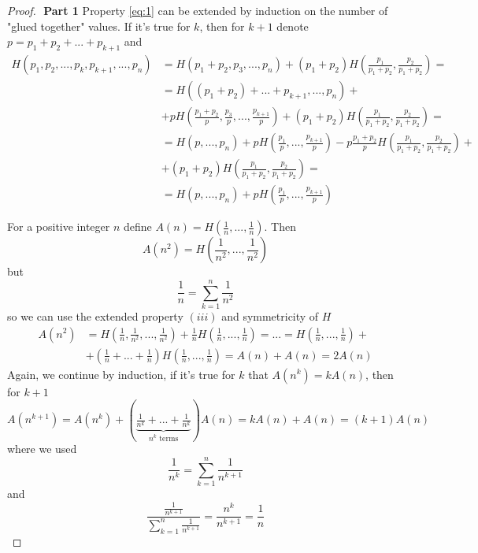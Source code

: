 \documentclass[12pt]{article}
\begin{document}
\begin{proof}
    $ $ 
    \noindent \textbf{Part 1} Property \eqref{eq:1} can be extended by induction on the number of "glued together" values. If it's true for $k$, then for $k+1$ denote $p = p_1 + p_2 + ... + p_{k+1}$ and
    \begin{align*}
        H(p_1, p_2, ..., p_k, p_{k+1}, ..., p_n) &= H(p_1 + p_2, p_3, ..., p_n) + (p_1 + p_2)H(\tfrac{p_1}{p_1 +p_2}, \tfrac{p_2}{p_1 +p_2}) = \\
        &= H((p_1 + p_2) + ... + p_{k+1}, ..., p_n) + \\
        &+ p H(\tfrac{p_1+p_2}{p}, \tfrac{p_3}{p}, ..., \tfrac{p_{k+1}}{p}) + (p_1 + p_2) H(\tfrac{p_1}{p_1 +p_2}, \tfrac{p_2}{p_1 +p_2}) = \\
        &= H(p, ..., p_n) + p H(\tfrac{p_1}{p}, ..., \tfrac{p_{k+1}}{p}) - p \tfrac{p_1+p_2}{p}H(\tfrac{p_1}{p_1 +p_2}, \tfrac{p_2}{p_1 +p_2}) + \\
        &+ (p_1 + p_2) H(\tfrac{p_1}{p_1 +p_2}, \tfrac{p_2}{p_1 +p_2}) = \\
        &=  H(p, ..., p_n) + p H(\tfrac{p_1}{p}, ..., \tfrac{p_{k+1}}{p})
    \end{align*}
    
    For a positive integer $n$ define $A(n) = H(\frac{1}{n}, ..., \frac{1}{n})$. Then
    \begin{equation}
        A(n^2) = H\left(\frac{1}{n^2}, ..., \frac{1}{n^2}\right)
    \end{equation}
    but 
    \begin{equation}
        \frac{1}{n} = \sum_{k=1}^{n}{\frac{1}{n^2}}
    \end{equation}
    so we can use the extended property $(iii)$ and symmetricity of $H$
    \begin{align*}
        A(n^2) &= H(\tfrac{1}{n}, \tfrac{1}{n^2}, ..., \tfrac{1}{n^2}) + \tfrac{1}{n} H(\tfrac{1}{n}, ..., \tfrac{1}{n}) = ... = H(\tfrac{1}{n}, ..., \tfrac{1}{n}) +\\
        &+ (\tfrac{1}{n} + ... + \tfrac{1}{n})H(\tfrac{1}{n}, ..., \tfrac{1}{n}) = A(n) + A(n) = 2A(n)
    \end{align*}
    Again, we continue by induction, if it's true for $k$ that $A(n^k) = kA(n)$, then for $k+1$ 
    \begin{equation}
        A(n^{k+1}) = A(n^k) + (\underbrace{\tfrac{1}{n^{k}} + ... + \tfrac{1}{n^{k}}}_{n^k \text{ terms}})A(n) = kA(n) + A(n) = (k+1)A(n)
    \end{equation}
    where we used 
    \begin{equation}
        \frac{1}{n^k} = \sum_{k=1}^{n}{\frac{1}{n^{k+1}}}
    \end{equation}
    and 
    \begin{equation}
        \frac{\frac{1}{n^{k+1}}}{\sum_{k=1}^{n}{\frac{1}{n^{k+1}}}} = \frac{n^k}{n^{k+1}} = \frac{1}{n}
    \end{equation}


\end{proof}
\end{document}
